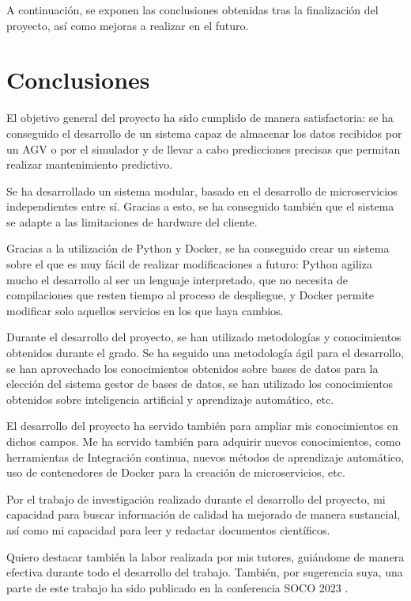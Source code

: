 
A continuación, se exponen las conclusiones obtenidas tras la finalización del proyecto, así como mejoras a realizar 
en el futuro.

\section{Conclusiones}

El objetivo general del proyecto ha sido cumplido de manera satisfactoria: se ha conseguido el desarrollo de un sistema
capaz de almacenar los datos recibidos por un AGV o por el simulador y de llevar a cabo predicciones precisas que permitan 
realizar mantenimiento predictivo.

Se ha desarrollado un sistema modular, basado en el desarrollo de microservicios independientes entre sí. Gracias a
esto, se ha conseguido también que el sistema se adapte a las limitaciones de hardware del cliente.

Gracias a la utilización de Python y Docker, se ha conseguido crear un sistema sobre el que es muy fácil de realizar 
modificaciones a futuro: Python agiliza mucho el desarrollo al ser un lenguaje interpretado, que no necesita de compilaciones 
que resten tiempo al proceso de despliegue, y Docker permite modificar solo aquellos servicios en los que haya cambios.

Durante el desarrollo del proyecto, se han utilizado metodologías y conocimientos obtenidos durante el grado. Se 
ha seguido una metodología ágil para el desarrollo, se han aprovechado los conocimientos obtenidos sobre bases de 
datos para la elección del sistema gestor de bases de datos, se han utilizado los conocimientos obtenidos sobre 
inteligencia artificial y aprendizaje automático, etc.

El desarrollo del proyecto ha servido también para ampliar mis conocimientos en dichos campos. Me ha servido 
también para adquirir nuevos conocimientos, como herramientas de Integración continua, nuevos métodos de aprendizaje 
automático, uso de contenedores de Docker para la creación de microservicios, etc.

Por el trabajo de investigación realizado durante el desarrollo del proyecto, mi capacidad para buscar información 
de calidad ha mejorado de manera sustancial, así como mi capacidad para leer y redactar documentos científicos.

Quiero destacar también la labor realizada por mis tutores, guiándome de manera efectiva durante todo el desarrollo del 
trabajo. También, por sugerencia suya, una parte de este trabajo ha sido publicado en la conferencia SOCO 2023 \cite{8364SOCO}.

